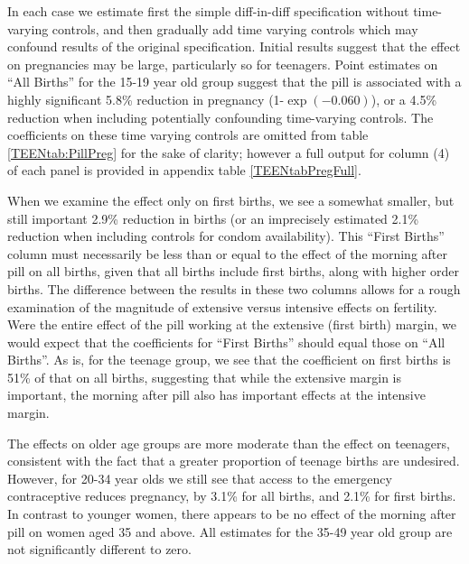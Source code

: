 In each case we estimate first the simple diff-in-diff specification without 
time-varying controls, and then gradually add time varying controls which may 
confound results of the original specification.  Initial results suggest that the 
effect on pregnancies may be large, particularly so for teenagers.  Point 
estimates on ``All Births'' for the 15-19 year old group suggest that the pill is 
associated with a highly significant 5.8\% reduction in pregnancy 
(1-$\exp(-0.060)$), or a 4.5\% reduction when including potentially confounding 
time-varying controls.  The coefficients on these time varying controls are omitted 
from table \ref{TEENtab:PillPreg} for the sake of clarity; however a full output 
for column (4) of each panel is provided in appendix table \ref{TEENtabPregFull}.

When we examine the effect only on first births, we see a somewhat smaller, but
still important 2.9\% reduction in births (or an imprecisely estimated 2.1\% 
reduction when including controls for condom availability).  This ``First Births''
column must necessarily be less than or equal to the effect of the morning after 
pill on all births, given that all births include first births, along with higher 
order births.  The difference between the results in these two columns allows
for a rough examination of the magnitude of extensive versus intensive effects
on fertility.  Were the entire effect of the pill working at the extensive 
(first birth) margin, we would expect that the coefficients for ``First Births''
should equal those on ``All Births''.  As is, for the teenage group, we see
that the coefficient on first births is 51\% of that on all births, suggesting
that while the extensive margin is important, the morning after pill also has
important effects at the intensive margin.

The effects on older age groups are more moderate than the effect on teenagers,
consistent with the fact that a greater proportion of teenage births are
undesired.  However, for 20-34 year olds we still see that access to the 
emergency contraceptive reduces pregnancy, by 3.1\% for all births, and 2.1\% for 
first births.  In contrast to younger women, there appears to be no effect of the 
morning after pill on women aged 35 and above.  All estimates for the 35-49 
year old group are not significantly different to zero.

